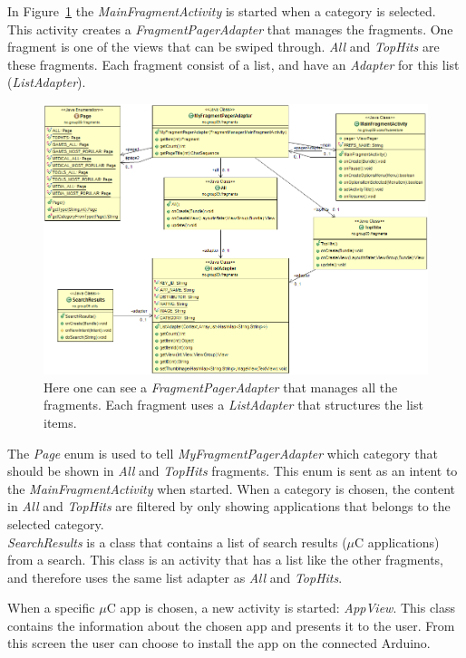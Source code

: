 	In Figure~\ref{fig:maingui} the \textit{MainFragmentActivity} is started when a category is selected. This activity creates a \textit{FragmentPagerAdapter} that manages the fragments. One fragment is one of the views that can be swiped through. \textit{All} and \textit{TopHits} are these fragments. Each fragment consist of a list, and have an \textit{Adapter} for this list (\textit{ListAdapter}).

	\begin{figure}[H]
	\hspace*{-1.0in}
	\includegraphics[scale=0.55]{images/UML/main.png}
	\caption[UML - Main GUI]{Here one can see a \textit{FragmentPagerAdapter} that manages all the fragments. Each fragment uses a \textit{ListAdapter} that structures the list items.}
	\label{fig:maingui}
	\end{figure}

	The \textit{Page} enum is used to tell \textit{MyFragmentPagerAdapter} which category that should be shown in \textit{All} and \textit{TopHits} fragments. This enum is sent as an intent to the \textit{MainFragmentActivity} when started. When a category is chosen, the content in \textit{All} and \textit{TopHits} are filtered by only showing applications that belongs to the selected category.\\

	\textit{SearchResults} is a class that contains a list of search results ($\mu$C applications) from a search. This class is an activity that has a list like the other fragments, and therefore uses the same list adapter as \textit{All} and \textit{TopHits}. 

	When a specific $\mu$C app is chosen, a new activity is started: \textit{AppView}. This class contains the information about the chosen app and presents it to the user. From this screen the user can choose to install the app on the connected Arduino.

